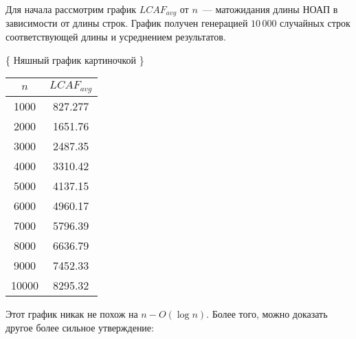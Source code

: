 Для начала рассмотрим график $LCAF_{avg}$ от $n$~--- матожидания длины НОАП в зависимости от длины строк. График получен генерацией $10\,000$ случайных строк соответствующей длины и усреднением результатов.

\{ Няшный график картиночкой \}

\begin{tabular}{|c|c|}
\hline
$n$ & $LCAF_{avg}$ \\
\hline
1000 & 827.277 \\
2000 & 1651.76 \\
3000 & 2487.35 \\
4000 & 3310.42 \\
5000 & 4137.15 \\
6000 & 4960.17 \\
7000 & 5796.39 \\
8000 & 6636.79 \\
9000 & 7452.33 \\
10000 & 8295.32 \\
\hline
\end{tabular}

Этот график никак не похож на $n - O(\log n)$. Более того, можно доказать другое более сильное утверждение:

